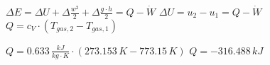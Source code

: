 \( \Delta E = \Delta U + \Delta \frac{w^2}{2} + \Delta \frac{g \cdot h}{2} = Q - \dot{W} \)  
\( \Delta U = u_2 - u_1 = Q - \dot{W} \)  
\( Q = c_V \cdot (T_{gas,2} - T_{gas,1}) \)  

\( Q = 0.633 \, \frac{kJ}{kg \cdot K} \cdot (273.153 \, K - 773.15 \, K) \)  
\( Q = -316.488 \, kJ \)